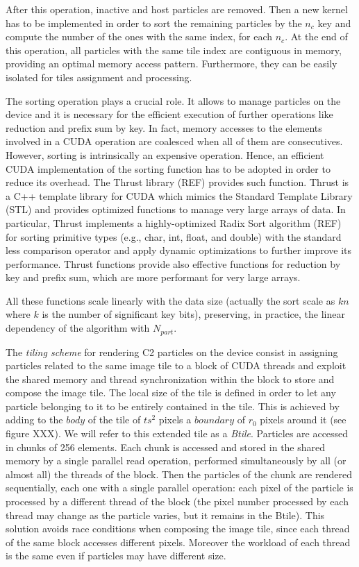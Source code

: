 \documentclass[11pt]{article}
\begin{document}
After this operation, inactive and host particles are removed. Then a new kernel has to be implemented in order to sort the remaining particles by the $n_c$ key and compute the number of the ones with the same index, for each $n_c$. 
At the end of this operation, all particles with the same tile index are contiguous in memory, providing an optimal memory access pattern. Furthermore, they can be easily 
isolated for tiles assignment and processing.

The sorting operation plays a crucial role. It allows to manage particles on the 
device and it is necessary for the efficient execution of further operations like 
reduction and prefix sum by key. In fact, memory accesses to the elements involved 
in a CUDA operation are coalesced when all of them are consecutives. However, sorting 
is intrinsically an expensive operation. Hence, an efficient CUDA implementation of
the sorting function has to be adopted in order to reduce its overhead. 
The Thrust library (REF) provides such function. Thrust is a C++ template library 
for CUDA which mimics the Standard Template Library (STL) and provides 
optimized functions to manage very large arrays of data. In particular, Thrust 
implements a highly-optimized Radix Sort algorithm (REF) for sorting primitive types
(e.g., char, int, float, and double) with the standard less comparison operator and 
apply dynamic optimizations to further improve its performance.
Thrust functions provide also effective functions for reduction by key and prefix sum, which are more performant for very large arrays.

All these functions scale linearly with the data size (actually the sort scale as $kn$ where $k$ is the number of significant key bits),
preserving, in practice, the linear dependency of the algorithm with $N_{part}$.

The \textit{tiling scheme} for rendering C2 particles on the device consist in 
assigning particles related to the same image tile to a block of CUDA threads 
and exploit the shared memory and thread synchronization within the block to store 
and compose the image tile. The local size of the tile is defined in order to let any particle belonging to it to be entirely contained in the tile. This is achieved by 
adding to the $body$ of the tile of $ts^2$ pixels a $boundary$ of $r_0$ pixels around it (see figure XXX). We will refer to this extended tile as a \textit{Btile}.
Particles are accessed in chunks of 256 elements. Each chunk is accessed and stored 
in the shared memory by a single parallel read operation, performed simultaneously by all (or almost all) the threads of the block. Then the particles of the chunk are rendered sequentially, each one with a single parallel operation: each pixel of the particle is processed by a different thread of the block (the pixel number processed by each thread may change as the particle varies, but it remains in the Btile). 
This solution avoids race conditions when composing the image tile, since each 
thread of the same block accesses different pixels. Moreover the workload of each thread is the same even if particles may have different size.
\end{document}
